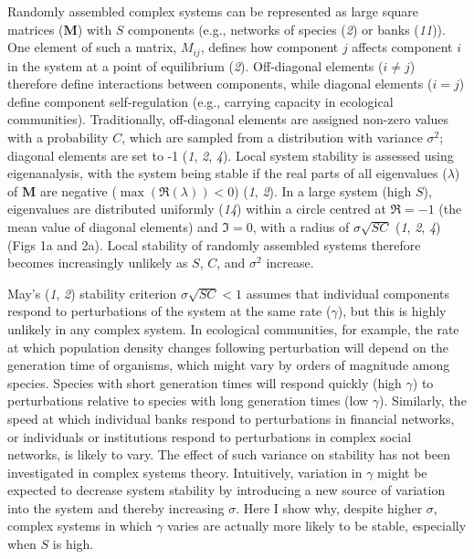 \documentclass[]{article}
\begin{document}
Randomly assembled complex systems can be represented as large square
matrices (\(\mathbf{M}\)) with \(S\) components (e.g., networks of
species (\emph{2}) or banks (\emph{11})). One element of such a matrix,
\(M_{ij}\), defines how component \(j\) affects component \(i\) in the
system at a point of equilibrium (\emph{2}). Off-diagonal elements
(\(i \neq j\)) therefore define interactions between components, while
diagonal elements (\(i = j\)) define component self-regulation (e.g.,
carrying capacity in ecological communities). Traditionally,
off-diagonal elements are assigned non-zero values with a probability
\(C\), which are sampled from a distribution with variance
\(\sigma^{2}\); diagonal elements are set to -1 (\emph{1}, \emph{2},
\emph{4}). Local system stability is assessed using eigenanalysis, with
the system being stable if the real parts of all eigenvalues
(\(\lambda\)) of \(\mathbf{M}\) are negative
(\(\max\left(\Re(\lambda)\right) < 0\)) (\emph{1}, \emph{2}). In a large
system (high \(S\)), eigenvalues are distributed uniformly (\emph{14})
within a circle centred at \(\Re = -1\) (the mean value of diagonal
elements) and \(\Im = 0\), with a radius of \(\sigma\sqrt{SC}\)
(\emph{1}, \emph{2}, \emph{4}) (Figs 1a and 2a). Local stability of
randomly assembled systems therefore becomes increasingly unlikely as
\(S\), \(C\), and \(\sigma^{2}\) increase.

May's (\emph{1}, \emph{2}) stability criterion \(\sigma\sqrt{SC} < 1\)
assumes that individual components respond to perturbations of the
system at the same rate (\(\gamma\)), but this is highly unlikely in any
complex system. In ecological communities, for example, the rate at
which population density changes following perturbation will depend on
the generation time of organisms, which might vary by orders of
magnitude among species. Species with short generation times will
respond quickly (high \(\gamma\)) to perturbations relative to species
with long generation times (low \(\gamma\)). Similarly, the speed at
which individual banks respond to perturbations in financial networks,
or individuals or institutions respond to perturbations in complex
social networks, is likely to vary. The effect of such variance on
stability has not been investigated in complex systems theory.
Intuitively, variation in \(\gamma\) might be expected to decrease
system stability by introducing a new source of variation into the
system and thereby increasing \(\sigma\). Here I show why, despite
higher \(\sigma\), complex systems in which \(\gamma\) varies are
actually more likely to be stable, especially when \(S\) is high.
\end{document}
